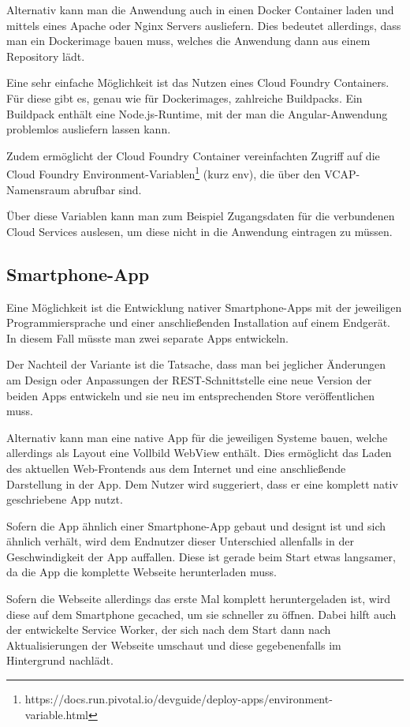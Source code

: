 Alternativ kann man die Anwendung auch in einen Docker Container laden und mittels eines Apache oder Nginx Servers
ausliefern. Dies bedeutet allerdings, dass man ein Dockerimage bauen muss, welches die Anwendung dann aus einem
Repository lädt.

Eine sehr einfache Möglichkeit ist das Nutzen eines Cloud Foundry Containers. Für diese gibt es, genau wie für
Dockerimages, zahlreiche Buildpacks. Ein Buildpack enthält eine Node.js-Runtime, mit der man die Angular-Anwendung
problemlos ausliefern lassen kann.

Zudem ermöglicht der Cloud Foundry Container vereinfachten Zugriff auf die Cloud Foundry
Environment-Variablen\footnote{https://docs.run.pivotal.io/devguide/deploy-apps/environment-variable.html} (kurz env),
die über den VCAP-Namensraum abrufbar sind.

Über diese Variablen kann man zum Beispiel Zugangsdaten für die verbundenen Cloud Services auslesen, um diese nicht in
die Anwendung eintragen zu müssen.

\subsection{Smartphone-App}
Eine Möglichkeit ist die Entwicklung nativer Smartphone-Apps mit der jeweiligen Programmiersprache und einer
anschließenden Installation auf einem Endgerät. In diesem Fall müsste man zwei separate Apps entwickeln.

Der Nachteil der Variante ist die Tatsache, dass man bei jeglicher Änderungen am Design oder Anpassungen der
REST-Schnittstelle eine neue Version der beiden Apps entwickeln und sie neu im entsprechenden Store veröffentlichen
muss.

Alternativ kann man eine native App für die jeweiligen Systeme bauen, welche allerdings als Layout eine Vollbild WebView
enthält. Dies ermöglicht das Laden des aktuellen Web-Frontends aus dem Internet und eine anschließende Darstellung in
der App. Dem Nutzer wird suggeriert, dass er eine komplett nativ geschriebene App nutzt.

Sofern die App ähnlich einer Smartphone-App gebaut und designt ist und sich ähnlich verhält, wird dem Endnutzer dieser
Unterschied allenfalls in der Geschwindigkeit der App auffallen. Diese ist gerade beim Start etwas langsamer, da die
App die komplette Webseite herunterladen muss.

Sofern die Webseite allerdings das erste Mal komplett heruntergeladen ist, wird diese auf dem Smartphone gecached, um
sie schneller zu öffnen. Dabei hilft auch der entwickelte Service Worker, der sich nach dem Start dann nach
Aktualisierungen der Webseite umschaut und diese gegebenenfalls im Hintergrund nachlädt.


